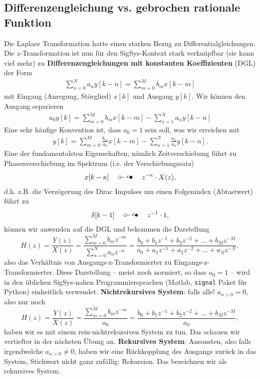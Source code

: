 \subsection*{Differenzengleichung vs. gebrochen rationale Funktion}
Die Laplace Transformation hatte einen starken Bezug zu Differentialgleichungen.
Die $z$-Transformation ist nun für den SigSys-Kontext stark verknüpfbar
(sie kann viel mehr) zu
\textbf{Differenzengleichungen mit konstanten Koeffizienten} (DGL) der Form
\begin{align}
\sum_{n=0}^N a_n y[k-n] = \sum_{m=0}^M b_m x[k-m]
\end{align}
mit Eingang (Anregung, Störglied) $x[k]$ und Ausgang $y[k]$.
%
Wir können den Ausgang separieren
\begin{align}
a_0 y[k] = \sum_{m=0}^M b_m x[k-m] - \sum_{n=1}^N a_n y[k-n]
\end{align}
%
Eine sehr häufige Konvention ist, dass $a_0=1$ sein soll, was wir erreichen mit
\begin{align}
y[k] = \sum_{m=0}^M \frac{b_m}{a_0} x[k-m] - \sum_{n=1}^N \frac{a_n}{a_0} y[k-n].
\end{align}
%
Eine der fundamentalsten Eigenschaften, nämlich Zeitverschiebung führt zu
Phasenverschiebung im Spektrum (i.e. der Verschiebungssatz)
\begin{align}
x[k-\kappa] \quad\ztransf\quad z^{-\kappa} \cdot X(z),
\end{align}
d.h. z.B. die Verzögerung des Dirac Impulses um einen Folgenindex (Abtastwert)
führt zu
\begin{align}
\delta[k-1] \quad\ztransf\quad z^{-1} \cdot 1,
\end{align}
können wir anwenden auf die DGL und bekommen die Darstellung
\begin{equation}
H(z) = \frac{Y(z)}{X(z)} =
\frac{\sum\limits_{m=0}^{M} b_m z^{-m}}{\sum\limits_{n=0}^{N} a_n z^{-n}}=
\frac{b_0 + b_1 z^{-1} + b_2 z^{-2} + \dots + b_M z^{-M}}{a_0 + a_1 z^{-1} + a_2 z^{-2} + \dots + a_N z^{-N}},
\end{equation}
also das Verhältnis von Ausgangs-z-Transformierter zu Eingangs-z-Transformierter.
Diese Darstellung -- meist noch normiert, so dass $a_0=1$ -- wird in
den üblichen SigSys-nahen Programmiersprachen (Matlab,
\texttt{signal} Paket für Python) einheitlich verwendet.
\textbf{Nichtrekursives System}: falls alle! $a_{n>0} = 0$, also nur noch
\begin{equation}
H(z) = \frac{Y(z)}{X(z)} =
\frac{\sum\limits_{m=0}^{M} b_m z^{-m}}{a_0}=
\frac{b_0 + b_1 z^{-1} + b_2 z^{-2} + \dots + b_M z^{-M}}{a_0},
\end{equation}
haben wir es mit einem rein-nichtrekursiven System zu tun. Das schauen wir
vertiefter in der nächsten Übung an.
%
\textbf{Rekursives System}: Ansonsten, also falls irgendwelche
$a_{n>0} \neq 0$, haben wir eine Rückkopplung des Ausgangs zurück in das System,
Stichwort nicht ganz zufällig: Rekursion. Das bezeichnen wir als rekursives System.

